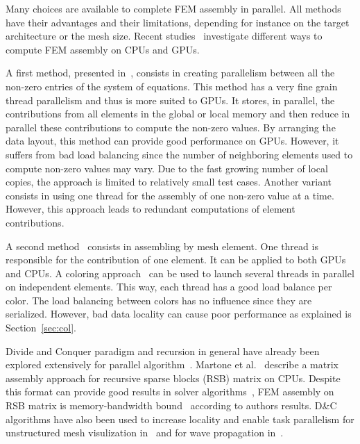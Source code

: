 \documentclass[10pt]{IOS-Book-Article}
\begin{document}
Many choices are available to complete FEM assembly in parallel.
All methods have their advantages and their limitations, depending for instance on the target architecture or the mesh size.
Recent studies~\cite{cecka2011assembly,CPUGPUasm} investigate different ways to compute FEM assembly on CPUs and GPUs.

A first method, presented in~\cite{cecka2011assembly}, consists in creating parallelism between all the non-zero entries of the system of equations.
This method has a very fine grain thread parallelism and thus is more suited to GPUs.
It stores, in parallel, the contributions from all elements in the global or local memory and then reduce in parallel these contributions to compute the non-zero values.
By arranging the data layout, this method can provide good performance on GPUs.
However, it suffers from bad load balancing since the number of neighboring elements used to compute non-zero values may vary.
Due to the fast growing number of local copies, the approach is limited to relatively small test cases.
Another variant consists in using one thread for the assembly of one non-zero value at a time.
However, this approach leads to redundant computations of element contributions.

A second method~\cite{cecka2011assembly} consists in assembling by mesh element.
One thread is responsible for the contribution of one element.
It can be applied to both GPUs and CPUs.
A coloring approach~\cite{CPUfe} can be used to launch several threads in parallel on independent elements.
This way, each thread has a good load balance per color.
The load balancing between colors has no influence since they are serialized.
However, bad data locality can cause poor performance as explained is Section~\ref{sec:col}.

Divide and Conquer paradigm and recursion in general have already been explored extensively for parallel algorithm~\cite{div}.
Martone et al.~\cite{RSBasm} describe a matrix assembly approach for recursive sparse blocks (RSB) matrix on CPUs.
Despite this format can provide good results in solver algorithms~\cite{RSBsolver}, FEM assembly on RSB matrix is memory-bandwidth bound~\cite{RSBasm} according to authors results.
D\&C algorithms have also been used to increase locality and enable task parallelism for unstructured mesh
visulization in~\cite{tvcg10,egpgv10,hppc10} and for wave propagation in~\cite{dc_specfem}.
\end{document}
